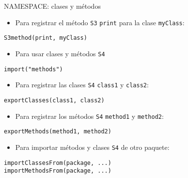 \documentclass[xcolor={usenames,svgnames,dvipsnames}]{beamer}
\begin{document}
\begin{frame}[label={sec:org1b7cac9},fragile]{NAMESPACE: clases y métodos}
 \begin{itemize}
\item Para registrar el método \texttt{S3} \texttt{print} para la clase \texttt{myClass}:
\end{itemize}
\lstset{language=r,label= ,caption= ,captionpos=b,numbers=none}
\begin{lstlisting}
S3method(print, myClass)
\end{lstlisting}
\begin{itemize}
\item Para usar clases y métodos \texttt{S4}
\end{itemize}
\lstset{language=r,label= ,caption= ,captionpos=b,numbers=none}
\begin{lstlisting}
import("methods")
\end{lstlisting}
\begin{itemize}
\item Para registrar las clases \texttt{S4} \texttt{class1} y \texttt{class2}:
\end{itemize}
\lstset{language=r,label= ,caption= ,captionpos=b,numbers=none}
\begin{lstlisting}
exportClasses(class1, class2)
\end{lstlisting}
\begin{itemize}
\item Para registrar los métodos \texttt{S4} \texttt{method1} y \texttt{method2}:
\end{itemize}
\lstset{language=r,label= ,caption= ,captionpos=b,numbers=none}
\begin{lstlisting}
exportMethods(method1, method2)
\end{lstlisting}
\begin{itemize}
\item Para importar métodos y clases \texttt{S4} de otro paquete:
\end{itemize}
\lstset{language=r,label= ,caption= ,captionpos=b,numbers=none}
\begin{lstlisting}
importClassesFrom(package, ...)
importMethodsFrom(package, ...)
\end{lstlisting}
\end{frame}
\end{document}
